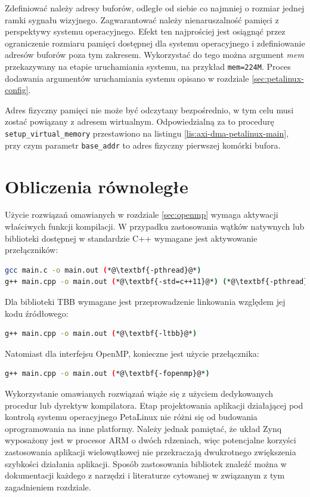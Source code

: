 Zdefiniować należy adresy buforów, odległe od siebie co najmniej o rozmiar jednej ramki sygnału wizyjnego. 
Zagwarantować należy nienaruszalność pamięci z perspektywy systemu operacyjnego. 
Efekt ten najprościej jest osiągnąć przez ograniczenie rozmiaru pamięci dostępnej dla systemu operacyjnego i zdefiniowanie adresów buforów poza tym zakresem. 
Wykorzystać do tego można argument \textit{mem} przekazywany na etapie uruchamiania systemu, na przykład \texttt{mem=224M}. 
Proces dodawania argumentów uruchamiania systemu opisano w rozdziale \ref{sec:petalinux-config}. %

Adres fizyczny pamięci nie może być odczytany bezpośrednio, w tym celu musi zostać powiązany z adresem wirtualnym. 
Odpowiedzialną za to procedurę \texttt{setup\_virtual\_memory} przestawiono na listingu \ref{lis:axi-dma-petalinux-main}, przy czym parametr \texttt{base\_addr} to adres fizyczny pierwszej komórki bufora. 

\section{Obliczenia równoległe}
\label{sec:multithreading-config}
Użycie rozwiązań omawianych w rozdziale \ref{sec:openmp} wymaga aktywacji właściwych funkcji kompilacji.
W przypadku zastosowania wątków natywnych lub biblioteki dostępnej w standardzie C++ wymagane jest aktywowanie przełączników: %

\begin{lstlisting}[language=bash]
gcc main.c -o main.out (*@\textbf{-pthread}@*)
g++ main.cpp -o main.out (*@\textbf{-std=c++11}@*) (*@\textbf{-pthread}@*)
\end{lstlisting}

Dla biblioteki TBB wymagane jest przeprowadzenie linkowania względem jej kodu źródłowego:

\begin{lstlisting}[language=bash]
g++ main.cpp -o main.out (*@\textbf{-ltbb}@*)
\end{lstlisting}

Natomiast dla interfejsu OpenMP, konieczne jest użycie przełącznika:

\begin{lstlisting}[language=bash]
g++ main.cpp -o main.out (*@\textbf{-fopenmp}@*)
\end{lstlisting}

Wykorzystanie omawianych rozwiązań wiąże się z użyciem dedykowanych procedur lub dyrektyw kompilatora. 
Etap projektowania aplikacji działającej pod kontrolą systemu operacyjnego PetaLinux nie różni się od budowania oprogramowania na inne platformy. Należy jednak pamiętać, że układ Zynq wyposażony jest w procesor ARM o dwóch rdzeniach, więc potencjalne korzyści zastosowania aplikacji wielowątkowej nie przekraczają dwukrotnego zwiększenia szybkości działania aplikacji.
Sposób zastosowania bibliotek znaleźć można w dokumentacji każdego z narzędzi i literaturze cytowanej w związanym z tym zagadnieniem rozdziale.

